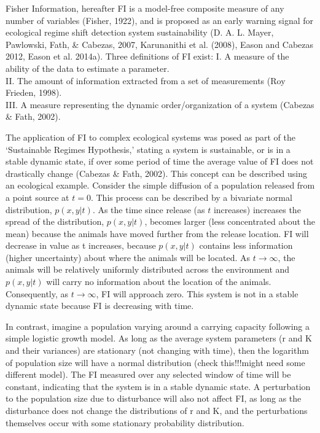 \documentclass[12pt,twoside,openany]{reedthesis}
\begin{document}
Fisher Information, hereafter FI is a model-free composite measure of
any number of variables (Fisher, 1922), and is proposed as an early
warning signal for ecological regime shift detection system
sustainability (D. A. L. Mayer, Pawlowski, Fath, \& Cabezas, 2007,
Karunanithi et al. (2008), Eason and Cabezas 2012, Eason et al. 2014a).
Three definitions of FI exist: I. A measure of the ability of the data
to estimate a parameter.\\
II. The amount of information extracted from a set of measurements (Roy
Frieden, 1998).\\
III. A measure representing the dynamic order/organization of a system
(Cabezas \& Fath, 2002).

The application of FI to complex ecological systems was posed as part of
the `Sustainable Regimes Hypothesis,' stating a system is sustainable,
or is in a stable dynamic state, if over some period of time the average
value of FI does not drastically change (Cabezas \& Fath, 2002). This
concept can be described using an ecological example. Consider the
simple diffusion of a population released from a point source at
\(t = 0\). This process can be described by a bivariate normal
distribution, \(p(x,y\vert t)\). As the time since release (as \(t\)
increases) increases the spread of the distribution, \(p(x,y\vert t)\),
becomes larger (less concentrated about the mean) because the animals
have moved further from the release location. FI will decrease in value
as t increases, because \(p(x,y\vert t)\) contains less information
(higher uncertainty) about where the animals will be located. As
\(t \rightarrow \infty\), the animals will be relatively uniformly
distributed across the environment and \(p(x,y\vert t)\) will carry no
information about the location of the animals. Consequently, as
\(t \rightarrow \infty\), FI will approach zero. This system is not in a
stable dynamic state because FI is decreasing with time.

In contrast, imagine a population varying around a carrying capacity
following a simple logistic growth model. As long as the average system
parameters (r and K and their variances) are stationary (not changing
with time), then the logarithm of population size will have a normal
distribution (check this!!!might need some different model). The FI
measured over any selected window of time will be constant, indicating
that the system is in a stable dynamic state. A perturbation to the
population size due to disturbance will also not affect FI, as long as
the disturbance does not change the distributions of r and K, and the
perturbations themselves occur with some stationary probability
distribution.
\end{document}
